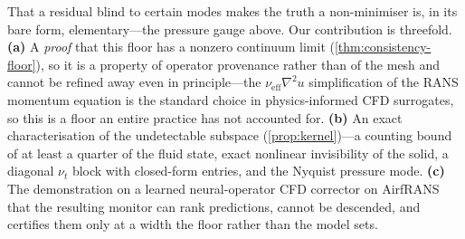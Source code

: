 That a residual blind to certain modes makes the truth a non-minimiser is, in its bare
form, elementary---the pressure gauge above. Our contribution is threefold.
\textbf{(a)} A \emph{proof} that this floor has a
nonzero continuum limit (\autoref{thm:consistency-floor}), so it is a property of operator
provenance rather than of the mesh and cannot be refined away even in principle---the
$\nu_{\mathrm{eff}}\nabla^2u$ simplification of the RANS momentum equation is the standard
choice in physics-informed CFD surrogates, so this is a floor an entire practice has not
accounted for. \textbf{(b)} An exact characterisation of the undetectable
subspace (\autoref{prop:kernel})---a counting bound of at least a quarter of the fluid
state, exact nonlinear invisibility of the solid, a diagonal $\nu_t$ block with closed-form
entries, and the Nyquist pressure mode. \textbf{(c)} The demonstration on a learned neural-operator CFD
corrector on AirfRANS that the resulting monitor can rank predictions, cannot be
descended, and certifies them only at a width the floor rather than the model sets.
